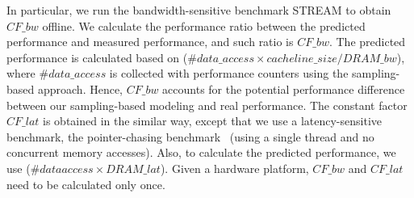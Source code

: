 In particular, we run the bandwidth-sensitive benchmark STREAM to obtain $CF\_bw$ offline.
We calculate the performance ratio between the predicted performance and measured performance,
and such ratio is $CF\_bw$. 
The predicted performance is calculated based on ($\#data\_access \times cacheline\_size/DRAM\_bw$), where $\#data\_access$ is collected with performance counters using the sampling-based approach. Hence, $CF\_bw$ accounts for the potential performance difference between our sampling-based modeling and real performance.
The constant factor $CF\_lat$ is obtained in the similar way, except that
we use a latency-sensitive benchmark, the pointer-chasing benchmark~\cite{pointer_chasing} (using a single thread and no concurrent memory accesses).
Also, to calculate the predicted performance, we use ($\#data access \times DRAM\_{lat}$).
Given a hardware platform, $CF\_bw$ and $CF\_lat$ need to be calculated only once. 

\begin{comment}
Given a data object, our performance model for a phase is formulated in Equations~\ref{eq:bft} and~\ref{eq:cost}.
Equation~\ref{eq:bft} estimates the performance benefit after migrating data from NVM and DRAM.
$\#data\_access$ is the number of data accesses to the target data object in main memory.
$\#data\_access$ is collected in Step 1 with performance counters.
Since we use a sampling-based approach to collect performance events,
the complete number of data accesses is upper-bounded by $\#data\_access \times sampling\_rate$.
Hence, the size of all data fetched from main memory in the phase is
$\#data\_access \times sampling\_rate \times cacheline\_size$.

\end{comment}

\begin{comment}
In Equation~\ref{eq:bft_lat}, we have another constant factor $CF\_lat$ to improve modeling accuracy.
The idea of using $CF\_lat$ for Equation~\ref{eq:bft_lat} is the same as the one for Equation~\ref{eq:bft_bw}: using a simple but powerful approach to improve modeling accuracy without increasing modeling complexity and runtime overhead.
\end{comment}

